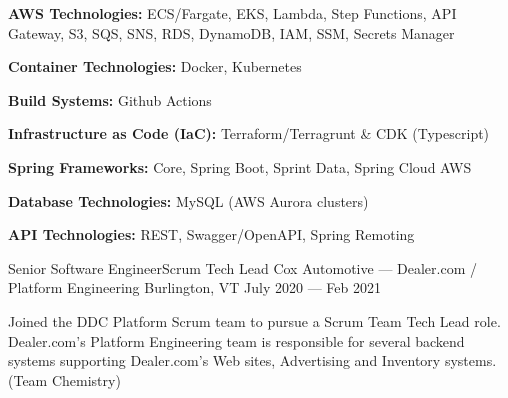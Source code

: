 \vspace{-2.00mm}
\begin{cventries}
    {} %
    {} %
    {} %
    {%
      \begin{cvitems} %
        \item {\textbf{AWS Technologies:} ECS/Fargate, EKS, Lambda, Step Functions, API Gateway, S3, SQS, SNS, RDS, DynamoDB, IAM, SSM, Secrets Manager}
        \item {\textbf{Container Technologies:} Docker, Kubernetes}
        \item {\textbf{Build Systems:} Github Actions}
        \item {\textbf{Infrastructure as Code (IaC):} Terraform/Terragrunt \& CDK (Typescript)}
        \item {\textbf{Spring Frameworks:} Core, Spring Boot, Sprint Data, Spring Cloud AWS}
        \item {\textbf{Database Technologies:} MySQL (AWS Aurora clusters)}
        \item {\textbf{API Technologies:} REST, Swagger/OpenAPI, Spring Remoting}
      \end{cvitems}
    }

  \cventry
    {Senior Software Engineer{\enskip\cdotp\enskip}Scrum Tech Lead} %
    {Cox Automotive --- Dealer.com / Platform Engineering} %
    {Burlington, VT} %
    {July 2020 --- Feb 2021} %
    {}
\end{cventries}
\vspace{-6.00mm}

\begin{cvparagraph}
  Joined the DDC Platform Scrum team to pursue a Scrum Team Tech Lead role. Dealer.com's Platform Engineering team is responsible for several backend systems supporting Dealer.com's Web sites, Advertising and Inventory systems. (Team Chemistry)
\end{cvparagraph}

